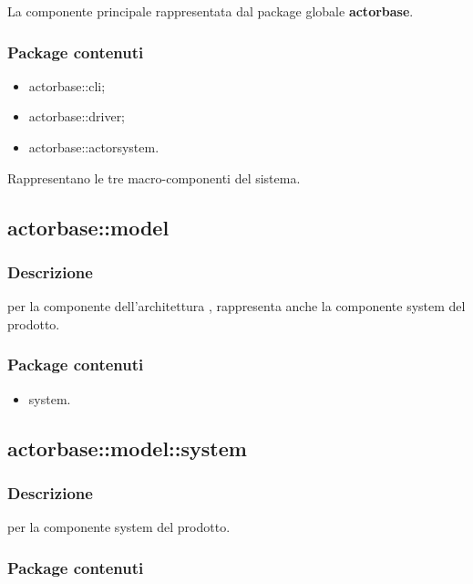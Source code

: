 \documentclass{scalatekids-article}
\begin{document}
La componente principale rappresentata dal package globale \textbf{actorbase}.

\subsubsection{Package contenuti}

\begin{itemize}
\item actorbase::cli;
\item actorbase::driver;
\item actorbase::actorsystem.
\end{itemize}

Rappresentano le tre macro-componenti del sistema.

\subsection{actorbase::model}

\subsubsection{Descrizione}

 per la componente  dell'architettura , rappresenta anche la componente system del prodotto.

\subsubsection{Package contenuti}

\begin{itemize}
\item system.
\end{itemize}

\subsection{actorbase::model::system}

\subsubsection{Descrizione}

 per la componente system del prodotto.

\subsubsection{Package contenuti}
\end{document}
